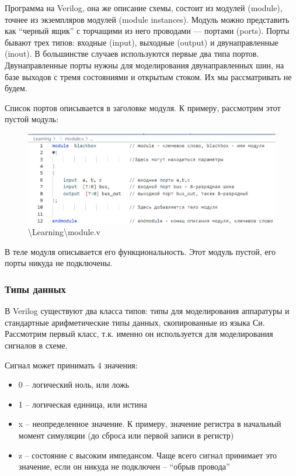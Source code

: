 \documentclass[a4paper,12pt]{article} %
\begin{document}
Программа на Verilog, она же описание схемы, состоит из модулей (module), точнее из экземпляров модулей (module instances). Модуль можно представить как “черный ящик” с торчащими из него проводами — портами (ports). Порты бывают трех типов: входные (input), выходные (output) и двунаправленные (inout). В большинстве случаев используются первые два типа портов. Двунаправленные порты нужны для моделирования двунаправленных шин, на базе выходов с тремя состояниями и открытым стоком. Их мы рассматривать не будем.

Список портов описывается в заголовке модуля. К примеру, рассмотрим этот пустой модуль:
\begin{figure}[H]
    \centering
    \includegraphics[width=1\linewidth]{Learning/module.png}
    \caption{\textbackslash Learning\textbackslash module.v}
\end{figure}

В теле модуля описывается его функциональность. Этот модуль пустой, его порты никуда не подключены.
\subsubsection{Типы данных}

В Verilog существуют два класса типов: типы для моделирования аппаратуры и стандартные арифметические типы данных, скопированные из языка Си. Рассмотрим первый класс, т.к. именно он используется для моделирования сигналов в схеме.

Сигнал может принимать 4 значения:
\begin{itemize}
    \item 0 – логический ноль, или ложь
    \item 1 – логическая единица, или истина
    \item x – неопределенное значение. К примеру, значение регистра в начальный момент симуляции (до сброса или первой записи в регистр)
    \item z – состояние с высоким импедансом. Чаще всего сигнал принимает это значение, если он никуда не подключен – “обрыв провода”
\end{itemize}
\end{document}
